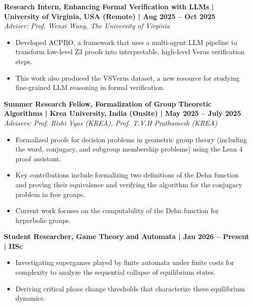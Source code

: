 \documentclass[a4paper,10pt]{article}
\newcommand{\role}[4]{
    \noindent \textbf{#1 | #3 | #2} \\
    \textit{#4}
}
\begin{document}
\vspace{5pt}
\role{Research Intern, Enhancing Formal Verification with LLMs}{Aug 2025 -- Oct 2025}{University of Virginia, USA (Remote)}{Adviser: Prof. Wenxi Wang, The University of Virginia}
\begin{itemize}
    \item Developed ACPRO, a framework that uses a multi-agent LLM pipeline to transform low-level Z3 proofs into interpretable, high-level Verus verification steps.
    \item This work also produced the VSVerus dataset, a new resource for studying fine-grained LLM reasoning in formal verification.
\end{itemize}

\vspace{5pt}
\role{Summer Research Fellow, Formalization of Group Theoretic Algorithms}{May 2025 -- July 2025}{Krea University, India (Onsite)}{Advisers: Prof. Rishi Vyas (KREA), Prof. T.V.H Prathamesh (KREA)}
\begin{itemize}
    \item Formalized proofs for decision problems in geometric group theory (including the word, conjugacy, and subgroup membership problems) using the Lean 4 proof assistant.
    \item Key contributions include formalizing two definitions of the Dehn function and proving their equivalence and verifying the algorithm for the conjugacy problem in free groups.
    \item Current work focuses on the computability of the Dehn function for hyperbolic groups.
\end{itemize}

\vspace{5pt}
\noindent
\textbf{Student Researcher, Game Theory and Automata | Jan 2026 -- Present | IISc}
\begin{itemize}
    \item Investigating supergames played by finite automata under finite costs for complexity to analyze the sequential collapse of equilibrium states.
    \item Deriving critical phase change thresholds that characterize these equilibrium dynamics.
\end{itemize}

\vspace{5pt}
\end{document}
